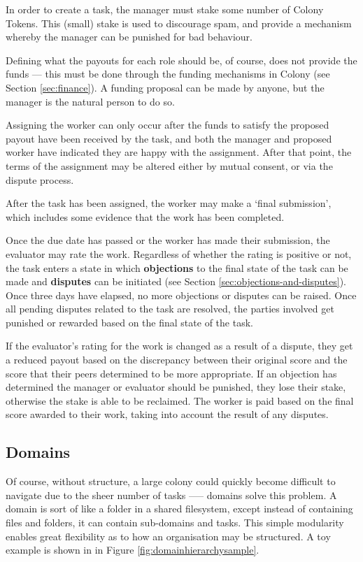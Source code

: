 In order to create a task, the manager must stake some number of Colony Tokens. This (small) stake is used to discourage spam, and provide a mechanism whereby the manager can be punished for bad behaviour. 

Defining what the payouts for each role should be, of course, does not provide the funds --- this must be done through the funding mechanisms in Colony (see Section \ref{sec:finance}). A funding proposal can be made by anyone, but the manager is the natural person to do so.

Assigning the worker can only occur after the funds to satisfy the proposed payout have been received by the task, and both the manager and proposed worker have indicated they are happy with the assignment. After that point, the terms of the assignment may be altered either by mutual consent, or via the dispute process.

After the task has been assigned, the worker may make a `final submission', which includes some evidence that the work has been completed.

Once the due date has passed or the worker has made their submission, the evaluator may rate the work. Regardless of whether the rating is positive or not, the task enters a state in which \textbf{objections} to the final state of the task can be made and \textbf{disputes} can be initiated (see Section \ref{sec:objections-and-disputes}). Once three days have elapsed, no more objections or disputes can be raised. Once all pending disputes related to the task are resolved, the parties involved get punished or rewarded based on the final state of the task.

If the evaluator's rating for the work is changed as a result of a dispute, they get a reduced payout based on the discrepancy between their original score and the score that their peers determined to be more appropriate. If an objection has determined the manager or evaluator should be punished, they lose their stake, otherwise the stake is able to be reclaimed. The worker is paid based on the final score awarded to their work, taking into account the result of any disputes.

\subsection{Domains}\label{sec:domains}

Of course, without structure, a large colony could quickly become difficult to navigate due to the sheer number of tasks —-- domains solve this problem. A domain is sort of like a folder in a shared filesystem, except instead of containing files and folders, it can contain sub-domains and tasks. This simple modularity enables great flexibility as to how an organisation may be structured. A toy example is shown in in Figure \ref{fig:domainhierarchysample}. 

